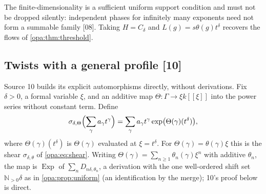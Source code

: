 \documentclass[11pt,oneside]{article}
\numberwithin{equation}{section}
\theoremstyle{definition}
\theoremstyle{remark}
\newcommand{\N}{\mathbb N}
\newcommand{\Exp}{\operatorname{Exp}}
\newcommand{\src}[1]{\textup{\textsf{\small[#1]}}}
\begin{document}
The finite-dimensionality is a sufficient uniform support condition and must
not be dropped silently: independent phases for infinitely many exponents need
not form a summable family \src{08}. Taking $H=C_\delta$ and
$L(g)=s\theta(g)t^\delta$ recovers the flows of \cref{opa:thm:threshold}.

\subsection{Twists with a general profile \src{10}}\label{opa:sc:sub:twists}

Source 10 builds its explicit automorphisms directly, without derivations. Fix
$\delta>0$, a formal variable $\xi$, and an additive map
$\Theta:\Gamma\to\xi k[[\xi]]$ into the power series without constant term.
Define
\begin{equation}\label{opa:sc:eq:twist}
 \sigma_{\delta,\Theta}\Bigl(\sum_\gamma a_\gamma t^\gamma\Bigr)
 =\sum_\gamma a_\gamma t^\gamma\exp\bigl(\Theta(\gamma)(t^\delta)\bigr),
\end{equation}
where $\Theta(\gamma)(t^\delta)$ is $\Theta(\gamma)$ evaluated at $\xi=t^\delta$. For
$\Theta(\gamma)=\theta(\gamma)\xi$ this is the shear $\sigma_{\delta,\theta}$ of
\eqref{opa:eq:shear}. Writing $\Theta(\gamma)=\sum_{n\ge1}\theta_n(\gamma)\xi^n$ with
additive $\theta_n$, the map is $\Exp$ of $\sum_nD_{n\delta,\theta_n}$, a derivation
with the one well-ordered shift set $\N_{>0}\delta$ as in \cref{opa:prop:uniform}
(an identification by the merge); 10's proof below is direct.
\end{document}
